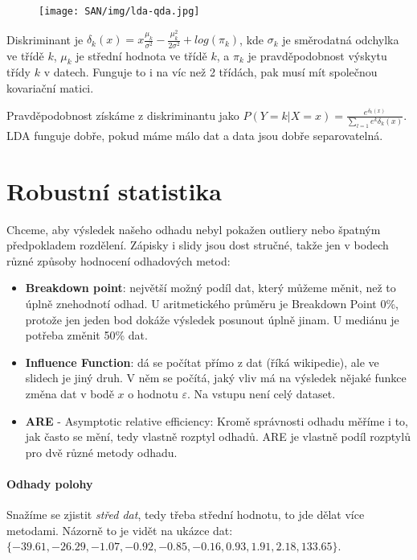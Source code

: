 \begin{figure}[ht!]
\centering
\texttt{[image: SAN/img/lda-qda.jpg]}
\end{figure}

Diskriminant je $\delta_k(x) = x\frac{\mu_k}{\sigma^2} - \frac{\mu_k^2}{2\sigma^2} + log(\pi_k)$, kde $\sigma_k$ je směrodatná odchylka ve třídě $k$, $\mu_k$ je střední hodnota ve třídě $k$, a $\pi_k$ je pravděpodobnost výskytu třídy $k$ v datech. Funguje to i na víc než 2 třídách, pak musí mít společnou kovariační matici.

Pravděpodobnost získáme z diskriminantu jako $P(Y=k|X=x) = \frac{e^{\delta_k(x)}}{\sum_{l=1}e^k{\delta_k(x)}}$. LDA funguje dobře, pokud máme málo dat a data jsou dobře separovatelná.




\section{Robustní statistika}

Chceme, aby výsledek našeho odhadu nebyl pokažen outliery nebo špatným předpokladem rozdělení. Zápisky i slidy jsou dost stručné, takže jen v bodech různé způsoby hodnocení odhadových metod:

\begin{itemize}
\item \textbf{Breakdown point}: největší možný podíl dat, který můžeme měnit, než to úplně znehodnotí odhad. U aritmetického průměru je Breakdown Point 0\%, protože jen jeden bod dokáže výsledek posunout úplně jinam. U mediánu je potřeba změnit 50\% dat.
\item \textbf{Influence Function}: dá se počítat přímo z dat (říká wikipedie), ale ve slidech je jiný druh. V něm se počítá, jaký vliv má na výsledek nějaké funkce změna dat v bodě $x$ o hodnotu $\varepsilon$. Na vstupu není celý dataset.
\item \textbf{ARE} - Asymptotic relative efficiency: Kromě správnosti odhadu měříme i to, jak často se mění, tedy vlastně rozptyl odhadů. ARE je vlastně podíl rozptylů pro dvě různé metody odhadu.
\end{itemize}

\paragraph{Odhady polohy} Snažíme se zjistit \textit{střed dat}, tedy třeba střední hodnotu, to jde dělat více metodami. Názorně to je vidět na ukázce dat: $\{-39.61, -26.29, -1.07, -0.92, -0.85, -0.16, 0.93, 1.91, 2.18, 133.65\}$.

